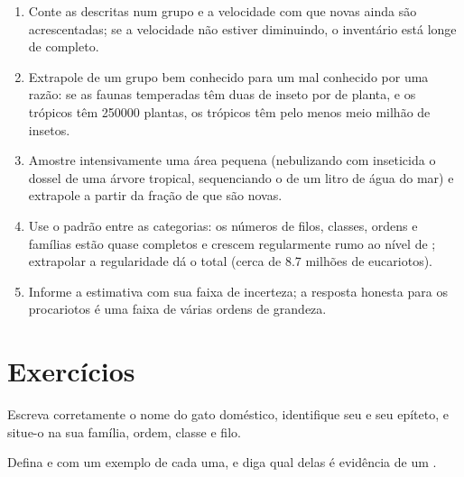\begin{method}\label{met:b1:classifying-biodiversity:estimate}
\begin{enumerate}
  \item Conte as  descritas num grupo e a velocidade com que
        novas ainda são acrescentadas; se a velocidade não estiver
        diminuindo, o inventário está longe de completo.
  \item Extrapole de um grupo bem conhecido para um mal conhecido por
        uma razão: se as faunas temperadas têm duas  de inseto
        por  de planta, e os trópicos têm \num{250000} plantas,
        os trópicos têm pelo menos meio milhão de insetos.
  \item Amostre intensivamente uma área pequena (nebulizando com
        inseticida o dossel de uma árvore tropical, sequenciando o 
        de um litro de água do mar) e extrapole a partir da fração de
         que são novas.
  \item Use o padrão entre as categorias: os números de filos,
        classes, ordens e famílias estão quase completos e crescem
        regularmente rumo ao nível de ; extrapolar a
        regularidade dá o total (cerca de \num{8.7} milhões de
        eucariotos).
  \item Informe a estimativa com sua faixa de incerteza; a resposta
        honesta para os procariotos é uma faixa de várias ordens de
        grandeza.
\end{enumerate}
\end{method}

\section{Exercícios}

\begin{exercise}[$\star$]\label{exo:b1:classifying-biodiversity:1}
Escreva corretamente o nome do gato doméstico, identifique seu 
e seu epíteto, e situe-o na sua família, ordem, classe e filo.
\end{exercise}

\begin{exercise}[$\star$]\label{exo:b1:classifying-biodiversity:2}
Defina  e  com um exemplo de cada uma, e diga qual
delas é evidência de um .
\end{exercise}

